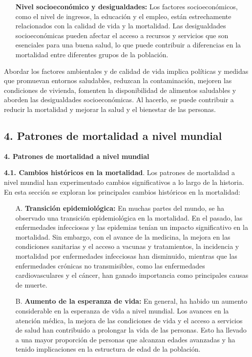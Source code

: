 \documentclass[8pt,a4paper]{beamer}
\begin{document}
{\begin{frame}{}
\begin{block}{}
\begin{enumerate}
\begin{enumerate}
\item[\ding{99}] \textbf{Nivel socioeconómico y desigualdades:} Los factores socioeconómicos, como el nivel de ingresos, la educación y el empleo, están estrechamente relacionados con la calidad de vida y la mortalidad. Las desigualdades socioeconómicas pueden afectar el acceso a recursos y servicios que son esenciales para una buena salud, lo que puede contribuir a diferencias en la mortalidad entre diferentes grupos de la población.
\end{enumerate}
Abordar los factores ambientales y de calidad de vida implica políticas y medidas que promuevan entornos saludables, reduzcan la contaminación, mejoren las condiciones de vivienda, fomenten la disponibilidad de alimentos saludables y aborden las desigualdades socioeconómicas. Al hacerlo, se puede contribuir a reducir la mortalidad y mejorar la salud y el bienestar de las personas.
\end{enumerate}
\end{block}
\end{frame}

\subsection{4. Patrones de mortalidad a nivel mundial}
\begin{frame}{\textbf{4. Patrones de mortalidad a nivel mundial}}
\setlength{\parskip}{3px}
\justifying
\begin{block}{\textbf{4.1. Cambios históricos en la mortalidad}.}
\setlength{\parskip}{3px}
\justifying
Los patrones de mortalidad a nivel mundial han experimentado cambios significativos a lo largo de la historia. En esta sección se exploran los principales cambios históricos en la mortalidad:
\begin{enumerate}
\setlength{\parskip}{3px}
\justifying
\item[A.] \textbf{Transición epidemiológica:} En muchas partes del mundo, se ha observado una transición epidemiológica en la mortalidad. En el pasado, las enfermedades infecciosas y las epidemias tenían un impacto significativo en la mortalidad. Sin embargo, con el avance de la medicina, la mejora en las condiciones sanitarias y el acceso a vacunas y tratamientos, la incidencia y mortalidad por enfermedades infecciosas han disminuido, mientras que las enfermedades crónicas no transmisibles, como las enfermedades cardiovasculares y el cáncer, han ganado importancia como principales causas de muerte.

\item[B.] \textbf{Aumento de la esperanza de vida:} En general, ha habido un aumento considerable en la esperanza de vida a nivel mundial. Los avances en la atención médica, la mejora de las condiciones de vida y el acceso a servicios de salud han contribuido a prolongar la vida de las personas. Esto ha llevado a una mayor proporción de personas que alcanzan edades avanzadas y ha tenido implicaciones en la estructura de edad de la población.


\end{enumerate}
\end{block}
\end{frame}}
\end{document}
